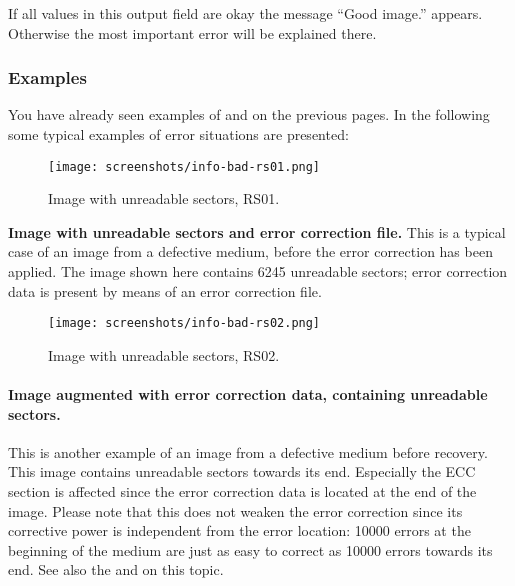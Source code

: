 \bigskip

If all values in this output field are okay the
message ``\textcolor{dkgreen}{Good image.}'' appears.
Otherwise the most important error will be explained there. 

\newpage

\subsubsection{Examples}

You have already seen examples
of 
and  on
the previous pages. In the following some typical examples
of error situations are presented:

\bigskip

\begin{figure}[h]
\centerline{\texttt{[image: screenshots/info-bad-rs01.png]}}
\caption{Image with unreadable sectors, RS01.}
\label{howto-info-bad-rs01}
\end{figure}

{\bf Image with unreadable sectors and error correction file.} This is a typical
case of an image from a defective medium, before the error correction has been
applied. The image shown here
contains 6245 unreadable sectors; error correction data is present
by means of an error correction file. 

\newpage

\begin{figure}[h]
\centerline{\texttt{[image: screenshots/info-bad-rs02.png]}}
\caption{Image with unreadable sectors, RS02.}
\label{howto-info-bad-rs02}
\end{figure}

\paragraph{Image augmented with error correction data, containing unreadable sectors.} This
is another example of an image from a defective medium before recovery.
This image contains unreadable sectors towards its end. Especially
the ECC section is affected since the error correction data is located
at the end of the image. Please note that this does not weaken the error
correction since its corrective power is independent from the error
location: 10000 errors at the beginning of the medium are just as easy
to correct as 10000 errors towards its end. See also the 
and  on this topic.


